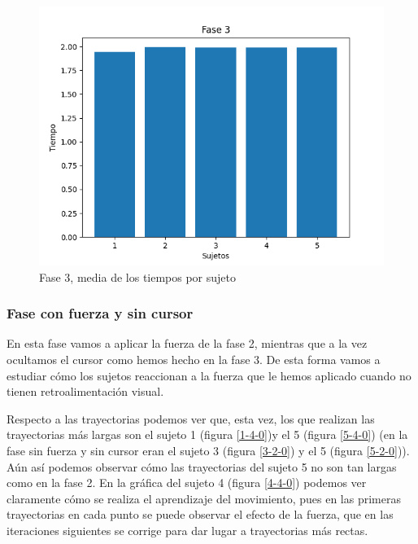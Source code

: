 \documentclass[a4paper,11pt, oneside]{book}
\begin{document}
\begin{figure}[H]
	\includegraphics[width=\linewidth]{fase3-time}
	\caption{Fase 3, media de los tiempos por sujeto}
	\label{fase3-time}
\end{figure}



\subsubsection{Fase con fuerza y sin cursor}

En esta fase vamos a aplicar la fuerza de la fase 2, mientras que a la vez ocultamos el cursor como hemos hecho en la fase 3. De esta forma vamos a estudiar cómo los sujetos reaccionan a la fuerza que le hemos aplicado cuando no tienen retroalimentación visual.


Respecto a las trayectorias podemos ver que, esta vez, los que realizan las trayectorias más largas son el sujeto 1 (figura \ref{1-4-0})y el 5 (figura \ref{5-4-0}) (en la fase sin fuerza y sin cursor eran el sujeto 3 (figura \ref{3-2-0}) y el 5 (figura \ref{5-2-0})). Aún así podemos observar cómo las trayectorias del sujeto 5 no son tan largas como en la fase 2. En la gráfica del sujeto 4 (figura \ref{4-4-0}) podemos ver claramente cómo se realiza el aprendizaje del movimiento, pues en las primeras trayectorias en cada punto se puede observar el efecto de la fuerza, que en las iteraciones siguientes se corrige para dar lugar a trayectorias más rectas.
\end{document}
